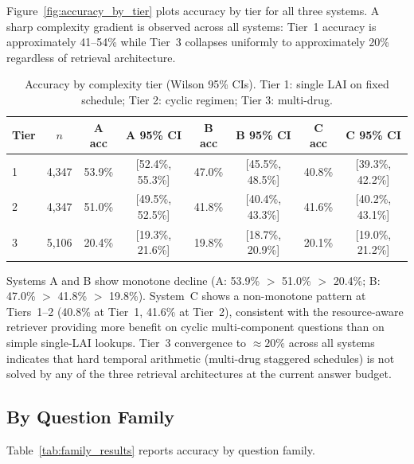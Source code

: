 Figure~\ref{fig:accuracy_by_tier} plots accuracy by tier for all three systems.
A sharp complexity gradient is observed across all systems: Tier~1 accuracy is
approximately 41--54\% while Tier~3 collapses uniformly to approximately 20\% regardless
of retrieval architecture.

\begin{table}[!htbp]
\centering
\caption{Accuracy by complexity tier (Wilson 95\% CIs).
Tier 1: single LAI on fixed schedule; Tier 2: cyclic regimen; Tier 3: multi-drug.}
\label{tab:tier_results}
{\small
\setlength{\tabcolsep}{4pt}
\begin{tabular}{lccccccc}
\toprule
Tier & $n$ & A acc & A 95\% CI & B acc & B 95\% CI & C acc & C 95\% CI \\
\midrule
1 & 4,347 & 53.9\% & [52.4\%, 55.3\%] & 47.0\% & [45.5\%, 48.5\%] & 40.8\% & [39.3\%, 42.2\%] \\
2 & 4,347 & 51.0\% & [49.5\%, 52.5\%] & 41.8\% & [40.4\%, 43.3\%] & 41.6\% & [40.2\%, 43.1\%] \\
3 & 5,106 & 20.4\% & [19.3\%, 21.6\%] & 19.8\% & [18.7\%, 20.9\%] & 20.1\% & [19.0\%, 21.2\%] \\
\bottomrule
\end{tabular}
}
\end{table}

Systems A and B show monotone decline (A: 53.9\% $>$ 51.0\% $>$ 20.4\%; B: 47.0\%
$>$ 41.8\% $>$ 19.8\%).  System~C shows a non-monotone pattern at Tiers~1--2
(40.8\% at Tier~1, 41.6\% at Tier~2), consistent with the resource-aware retriever
providing more benefit on cyclic multi-component questions than on simple single-LAI
lookups.  Tier~3 convergence to $\approx 20\%$ across all systems indicates that
hard temporal arithmetic (multi-drug staggered schedules) is not solved by any of
the three retrieval architectures at the current answer budget.

\subsection{By Question Family}
\label{sec:results:families}

Table~\ref{tab:family_results} reports accuracy by question family.

